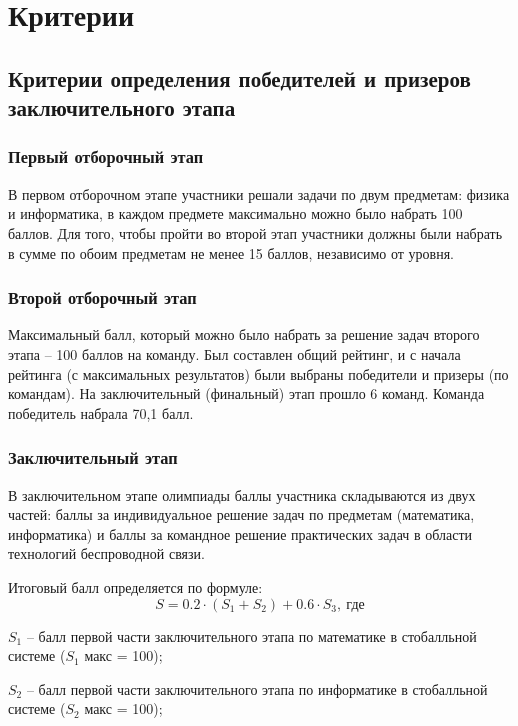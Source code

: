 \part{Критерии}

\chapter{Критерии определения победителей и призеров заключительного этапа}

\section{Первый отборочный этап}

В первом отборочном этапе участники решали задачи по двум предметам: физика и информатика, в каждом предмете максимально можно было набрать 100 баллов. Для того, чтобы пройти во второй этап участники  должны были набрать в сумме по обоим предметам не менее 15 баллов, независимо от уровня.

\section{Второй отборочный этап}

Максимальный балл, который можно было набрать за решение задач второго этапа – 100 баллов на команду. Был составлен общий рейтинг, и с начала рейтинга (с максимальных результатов) были выбраны победители и призеры (по командам). На заключительный (финальный) этап прошло 6 команд. Команда победитель набрала 70,1 балл.   

\section{Заключительный этап}

В заключительном этапе олимпиады баллы участника складываются из двух частей: баллы за индивидуальное решение задач по предметам (математика, информатика) и баллы за командное решение практических задач в области технологий беспроводной связи.

Итоговый балл определяется по формуле: $$S = 0.2 \cdot (S_1+S_2) + 0.6 \cdot S_3, \: \text{где}$$

$S_1$ – балл первой части заключительного этапа по математике в стобалльной системе ($S_1$ макс = 100);

$S_2$ – балл первой части заключительного этапа по информатике в стобалльной системе ($S_2$ макс = 100);

